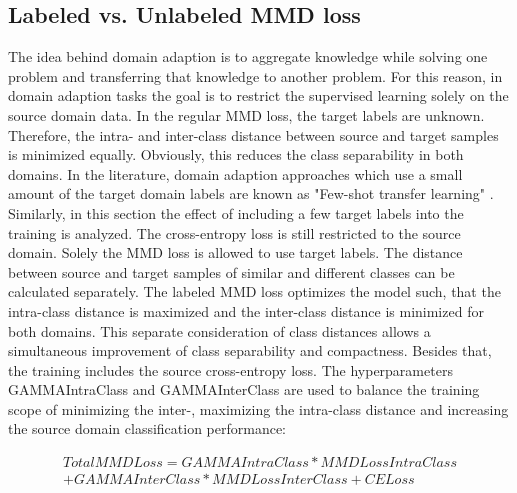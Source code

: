 \subsection{Labeled vs. Unlabeled MMD loss} \label{sec:Differences of labeled and unlabeled MMD loss}

The idea behind domain adaption is to aggregate knowledge while solving one problem and transferring that knowledge to another problem. For this reason, in domain adaption tasks the goal is to restrict the supervised learning solely on the source domain data. In the regular MMD loss, the target labels are unknown. Therefore, the intra- and inter-class distance between source and target samples is minimized equally. Obviously, this reduces the class separability in both domains. In the literature, domain adaption approaches which use a small amount of the target domain labels are known as "Few-shot transfer learning" \cite{WU2020}. Similarly, in this section the effect of including a few target labels into the training is analyzed. The cross-entropy loss is still restricted to the source domain. Solely the MMD loss is allowed to use target labels. The distance between source and target samples of similar and different classes can be calculated separately. The labeled MMD loss optimizes the model such, that the intra-class distance is maximized and the inter-class distance is minimized for both domains. This separate consideration of class distances allows a simultaneous improvement of class separability and compactness. Besides that, the training includes the source cross-entropy loss. The hyperparameters GAMMAIntraClass and GAMMAInterClass are used to balance the training scope of minimizing the inter-, maximizing the intra-class distance and increasing the source domain classification performance:

\begin{equation}
\begin{split}
    TotalMMDLoss = GAMMAIntraClass * MMDLossIntraClass\\ + GAMMAInterClass * MMDLossInterClass + CELoss
\end{split}
\end{equation}

